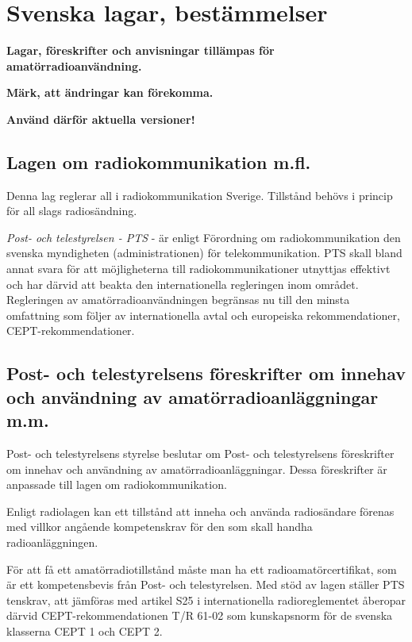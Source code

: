 \section{Svenska lagar, bestämmelser}

\textbf{Lagar, föreskrifter och anvisningar tillämpas för
  amatörradioanvändning.}

\textbf{Märk, att ändringar kan förekomma.}

\textbf{Använd därför aktuella versioner!}


\subsection{Lagen om radiokommunikation m.fl.}

Denna lag reglerar all i radiokommunikation Sverige. Tillstånd behövs
i princip för all slags radiosändning.

\emph{Post- och telestyrelsen - PTS} - är enligt Förordning om
radiokommunikation den svenska myndigheten (administrationen) för
telekommunikation. PTS skall bland annat svara för att möjligheterna
till radiokommunikationer utnyttjas effektivt och har därvid att
beakta den internationella regleringen inom området. Regleringen av
amatörradioanvändningen begränsas nu till den minsta omfattning som
följer av internationella avtal och europeiska rekommendationer,
CEPT-rekommendationer.

\subsection{Post- och telestyrelsens föreskrifter om innehav och användning av
  amatörradioanläggningar m.m.}

Post- och telestyrelsens styrelse beslutar om Post- och telestyrelsens
föreskrifter om innehav och användning av amatörradioanläggningar.
Dessa föreskrifter är anpassade till lagen om radiokommunikation.

Enligt radiolagen kan ett tillstånd att inneha och använda
radiosändare förenas med villkor angående kompetenskrav för den som
skall handha radioanläggningen.

För att få ett amatörradiotillstånd måste man ha ett
radioamatörcertifikat, som är ett kompetensbevis från Post- och
telestyrelsen. Med stöd av lagen ställer PTS tenskrav, att jämföras
med artikel S25 i internationella radioreglementet åberopar därvid
CEPT-rekommendationen T/R 61-02 som kunskapsnorm för de svenska
klasserna CEPT 1 och CEPT 2.

